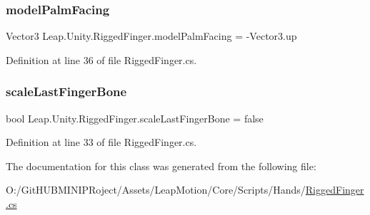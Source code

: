 \mbox{\label{class_leap_1_1_unity_1_1_rigged_finger_ab8d09b7fb7d2390e19d7f44505dd8dec}} 
\subsubsection{\texorpdfstring{modelPalmFacing}{modelPalmFacing}}
{\footnotesize\ttfamily Vector3 Leap.\+Unity.\+Rigged\+Finger.\+model\+Palm\+Facing = -\/Vector3.\+up}



Definition at line 36 of file Rigged\+Finger.\+cs.

\mbox{\label{class_leap_1_1_unity_1_1_rigged_finger_af154c9566ec146520ae5ec79b949c0d0}} 
\subsubsection{\texorpdfstring{scaleLastFingerBone}{scaleLastFingerBone}}
{\footnotesize\ttfamily bool Leap.\+Unity.\+Rigged\+Finger.\+scale\+Last\+Finger\+Bone = false}



Definition at line 33 of file Rigged\+Finger.\+cs.



The documentation for this class was generated from the following file\+:\begin{DoxyCompactItemize}
\item 
O\+:/\+Git\+H\+U\+B\+M\+I\+N\+I\+P\+Roject/\+Assets/\+Leap\+Motion/\+Core/\+Scripts/\+Hands/\mbox{\hyperlink{_rigged_finger_8cs}{Rigged\+Finger.\+cs}}\end{DoxyCompactItemize}
